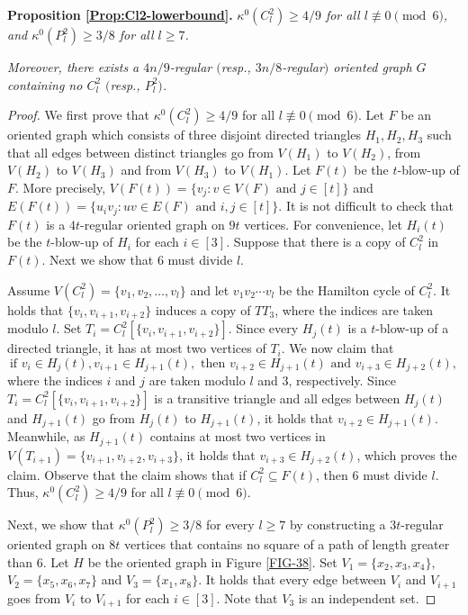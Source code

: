 \documentclass[11pt,a4paper,reqno]{amsart}
\theoremstyle{definition} %
\begin{document}
\medskip
\noindent\textbf{Proposition \ref{Prop:Cl2-lowerbound}.} 
\textit{$\kappa^0(C_l^2)\geqslant4/9$ for all $l\not\equiv 0 \pmod 6$, and $\kappa^0(P_l^2)\geqslant3/8$ for all $l\geqslant 7$.}

\textit{Moreover, there exists a $4n/9$-regular $($resp., $3n/8$-regular$)$ oriented graph $G$ containing no $C_l^2$ $($resp., $P_l^2$$)$.}



\begin{proof}

We first prove that $\kappa^0(C_l^2)\geqslant4/9$ for all $l\not\equiv 0 \pmod 6$. Let $F$ be an oriented graph which consists of three disjoint directed triangles $H_1,H_2,H_3$ such that all edges between distinct triangles go from $V(H_1)$ to $V(H_2)$, from $V(H_2)$ to $V(H_3)$ and from $V(H_3)$ to $V(H_1)$. Let $F(t)$ be the $t$-blow-up of $F$. More precisely, $V(F(t))=\{v_j:v\in V(F)\text{ and }j\in[t]\}$ and 
$E(F(t))=\{u_iv_j:uv\in E(F)\text{ and }i,j\in[t]\}$. It is not difficult to check that $F(t)$ is a $4t$-regular oriented graph on $9t$ vertices. For convenience, let $H_i(t)$ be the $t$-blow-up of $H_i$ for each $i\in[3]$. Suppose that there is a copy of $C_l^2$ in $F(t)$. Next we show that $6$ must divide $l$.

  Assume  $V(C_l^2)=\{v_1, v_2, \ldots, v_l\}$ and  let $v_1v_2\cdots v_l$ be the Hamilton cycle of $C_l^2$.  It holds that $\{v_i, v_{i+1}, v_{i+2}\}$ induces a copy of $TT_3$, where the indices are taken modulo $l$. Set $T_i=C_l^2[\{v_i, v_{i+1}, v_{i+2}\}]$. Since every $H_j(t)$ is a $t$-blow-up of a directed triangle, it has at most two vertices of $T_i$. We now claim  that 
$$\mbox{if }v_i\in H_j(t), v_{i+1}\in H_{j+1}(t),\mbox{ then }v_{i+2}\in H_{j+1}(t) \mbox{ and } v_{i+3}\in H_{j+2}(t),$$ 
where the indices $i$ and $j$ are taken modulo $l$ and $3$, respectively. 
Since $T_i=C_l^2[\{v_i, v_{i+1}, v_{i+2}\}]$ is a transitive triangle and all edges between $H_j(t)$ and $H_{j+1}(t)$ go from $H_j(t)$ to $H_{j+1}(t)$, it holds that $v_{i+2}\in H_{j+1}(t)$. 
Meanwhile, as $H_{j+1}(t)$ contains at most two vertices in $V(T_{i+1})=\{v_{i+1},v_{i+2},v_{i+3}\}$, it holds that $v_{i+3}\in H_{j+2}(t)$, which proves the claim. Observe that the claim shows that if $C_l^2\subseteq F(t)$, then $6$ must divide $l$. Thus, 
$\kappa^0(C_l^2)\geqslant4/9$ for all $l\not\equiv 0 \pmod 6$.

Next, we show that $\kappa^0(P_l^2)\geqslant 3/8$ for every $l\geqslant 7$ by constructing a $3t$-regular oriented graph on $8t$ vertices that contains no square of a path of length greater than $6$. Let $H$ be the oriented graph in Figure \ref{FIG-38}. Set $V_1 = \{x_2, x_3, x_4\} $, $V_2 = \{x_5, x_6, x_7\}$ and $V_3 = \{x_1, x_8\}$. It holds that every edge between $V_i$ and $V_{i+1}$ goes from $V_i$ to $V_{i+1}$ for each $i\in[3]$. Note that $V_3$ is an independent set. 


\end{proof}
\end{document}
